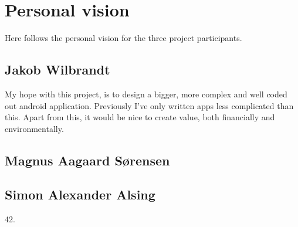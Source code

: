 
\chapter{Personal vision}
Here follows the personal vision for the three project participants.

\section{Jakob Wilbrandt}

My hope with this project, is to design a bigger, more complex and well coded out android application. Previously I've only written apps less complicated than this. Apart from this, it would be nice to create value, both financially and environmentally.


\section{Magnus Aagaard Sørensen}


\section{Simon Alexander Alsing}

42.